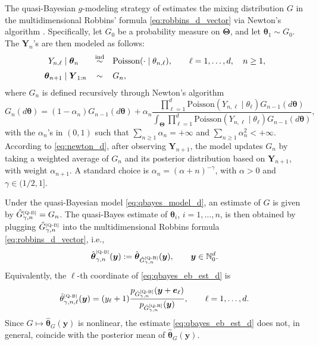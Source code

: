 \documentclass[twoside,12pt]{article}
\def\simind{\stackrel{\mbox{\scriptsize{ind}}}{\sim}}
\begin{document}
The quasi-Bayesian $g$-modeling strategy of \citet{Fav(24)} estimates the mixing distribution $G$ in the multidimensional Robbins' formula \eqref{eq:robbins_d_vector} via Newton's algorithm \citep{New(98)}. Specifically, let $G_0$ be a probability measure on $\boldsymbol\Theta$, and let $\boldsymbol\theta_1\sim G_0$. The $\boldsymbol{Y}_{n}$'s are then modeled as follows:
\begin{equation}\label{eq:qbayes_model_d}
\begin{array}{r@{\;}c@{\;}l@{\quad}c@{\quad}l}
Y_{n,\ell}& \mid &\boldsymbol\theta_n& \simind &\mathrm{Poisson}(\cdot\mid \theta_{n,\ell}),\qquad \ell=1,\ldots,d,\quad n\geq 1,\\[0.2cm]
\boldsymbol\theta_{n+1}& \mid &\boldsymbol Y_{1:n}& \sim &G_n,
\end{array}
\end{equation}
where $G_n$ is defined recursively through Newton's algorithm
\begin{equation}\label{eq:newton_d}
G_n(d\boldsymbol\theta)=(1-\alpha_n)G_{n-1}(d\boldsymbol\theta)+\alpha_n\frac{\prod_{\ell=1}^{d}\mathrm{Poisson}(Y_{n,\ell}\mid\theta_{\ell})G_{n-1}(d\boldsymbol\theta)
}{\int_{\boldsymbol\Theta}\prod_{\ell=1}^{d}\mathrm{Poisson}(Y_{n,\ell}\mid\theta_{\ell})G_{n-1}(d\boldsymbol\theta)},
\end{equation}
with the $\alpha_{n}$'s in $(0,1)$ such that  $\sum_{n\geq1}\alpha_{n}=+\infty$ and $\sum_{n\geq1}\alpha^{2}_{n}<+\infty$. According to \eqref{eq:newton_d}, after observing $\boldsymbol Y_{n+1}$, the model updates $G_n$ by taking a weighted average of $G_n$ and its posterior distribution based on $\boldsymbol Y_{n+1}$, with weight $\alpha_{n+1}$. A standard choice is \(\alpha_n=(\alpha+n)^{-\gamma}\), with \(\alpha>0\) and \(\gamma\in(1/2,1]\).

Under the quasi-Bayesian model \eqref{eq:qbayes_model_d}, an estimate of $G$ is given by $\hat G_{\gamma,n}^{\text{\tiny{[Q-B]}}}=G_n$. The quasi-Bayes estimate of $\boldsymbol\theta_i$, $i=1,\ldots,n$, is then obtained by plugging \(\hat G_{\gamma,n}^{\text{\tiny{[Q-B]}}}\) into the multidimensional Robbins formula \eqref{eq:robbins_d_vector}, i.e.,
\begin{equation}\label{eq:qbayes_eb_est_d}
\hat{\boldsymbol\theta}^{\text{\tiny{[Q-B]}}}_{\gamma,n}(\boldsymbol y):=\hat{\boldsymbol\theta}_{\hat G_{\gamma,n}^{\text{\tiny{[Q-B]}}}}(\boldsymbol y),\qquad\boldsymbol y\in\mathbb N_0^d.
\end{equation}
Equivalently, the $\ell$-th coordinate of \eqref{eq:qbayes_eb_est_d} is
\begin{displaymath}
\hat\theta^{\text{\tiny{[Q-B]}}}_{\gamma,n,\ell}(\boldsymbol y)=(y_\ell+1)\frac{p_{\hat G_{\gamma,n}^{\text{\tiny{[Q-B]}}}}(\boldsymbol y+\boldsymbol e_\ell)}{p_{\hat G_{\gamma,n}^{\text{\tiny{[Q-B]}}}}(\boldsymbol y)},\qquad \ell=1,\ldots,d.
\end{displaymath}
Since \(G\mapsto\hat{\boldsymbol\theta}_G(\boldsymbol y)\) is nonlinear, the estimate \eqref{eq:qbayes_eb_est_d} does not, in general, coincide with the posterior mean of \(\hat{\boldsymbol\theta}_G(\boldsymbol y)\).
\end{document}

